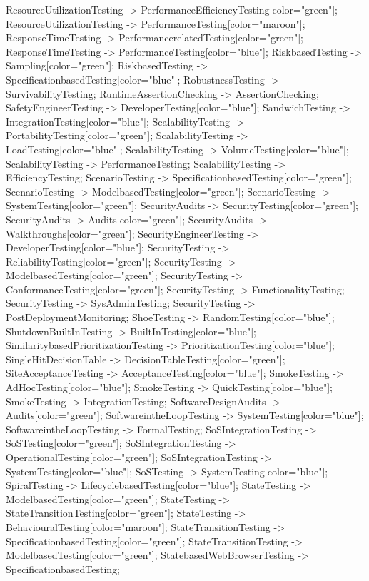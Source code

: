 \documentclass{article}
\begin{document}
{ResourceUtilizationTesting -> PerformanceEfficiencyTesting[color="green"];
ResourceUtilizationTesting -> PerformanceTesting[color="maroon"];
ResponseTimeTesting -> PerformancerelatedTesting[color="green"];
ResponseTimeTesting -> PerformanceTesting[color="blue"];
RiskbasedTesting -> Sampling[color="green"];
RiskbasedTesting -> SpecificationbasedTesting[color="blue"];
RobustnessTesting -> SurvivabilityTesting;
RuntimeAssertionChecking -> AssertionChecking;
SafetyEngineerTesting -> DeveloperTesting[color="blue"];
SandwichTesting -> IntegrationTesting[color="blue"];
ScalabilityTesting -> PortabilityTesting[color="green"];
ScalabilityTesting -> LoadTesting[color="blue"];
ScalabilityTesting -> VolumeTesting[color="blue"];
ScalabilityTesting -> PerformanceTesting;
ScalabilityTesting -> EfficiencyTesting;
ScenarioTesting -> SpecificationbasedTesting[color="green"];
ScenarioTesting -> ModelbasedTesting[color="green"];
ScenarioTesting -> SystemTesting[color="green"];
SecurityAudits -> SecurityTesting[color="green"];
SecurityAudits -> Audits[color="green"];
SecurityAudits -> Walkthroughs[color="green"];
SecurityEngineerTesting -> DeveloperTesting[color="blue"];
SecurityTesting -> ReliabilityTesting[color="green"];
SecurityTesting -> ModelbasedTesting[color="green"];
SecurityTesting -> ConformanceTesting[color="green"];
SecurityTesting -> FunctionalityTesting;
SecurityTesting -> SysAdminTesting;
SecurityTesting -> PostDeploymentMonitoring;
ShoeTesting -> RandomTesting[color="blue"];
ShutdownBuiltInTesting -> BuiltInTesting[color="blue"];
SimilaritybasedPrioritizationTesting -> PrioritizationTesting[color="blue"];
SingleHitDecisionTable -> DecisionTableTesting[color="green"];
SiteAcceptanceTesting -> AcceptanceTesting[color="blue"];
SmokeTesting -> AdHocTesting[color="blue"];
SmokeTesting -> QuickTesting[color="blue"];
SmokeTesting -> IntegrationTesting;
SoftwareDesignAudits -> Audits[color="green"];
SoftwareintheLoopTesting -> SystemTesting[color="blue"];
SoftwareintheLoopTesting -> FormalTesting;
SoSIntegrationTesting -> SoSTesting[color="green"];
SoSIntegrationTesting -> OperationalTesting[color="green"];
SoSIntegrationTesting -> SystemTesting[color="blue"];
SoSTesting -> SystemTesting[color="blue"];
SpiralTesting -> LifecyclebasedTesting[color="blue"];
StateTesting -> ModelbasedTesting[color="green"];
StateTesting -> StateTransitionTesting[color="green"];
StateTesting -> BehaviouralTesting[color="maroon"];
StateTransitionTesting -> SpecificationbasedTesting[color="green"];
StateTransitionTesting -> ModelbasedTesting[color="green"];
StatebasedWebBrowserTesting -> SpecificationbasedTesting;
}
\end{document}
